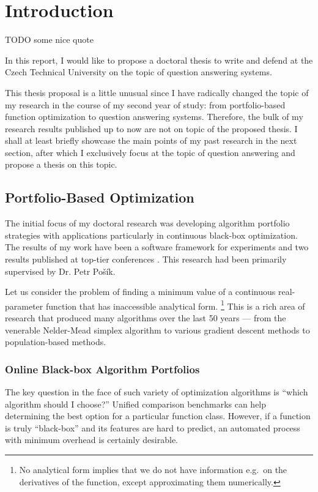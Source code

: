 \chapter{Introduction}
\label{ch:intro}

TODO some nice quote

In this report, I would like to propose a doctoral thesis to write
and defend at the Czech Technical University on the topic of question
answering systems.

This thesis proposal is a little unusual since I have radically changed
the topic of my research in the course of my second year of study:
from portfolio-based function optimization to question answering systems.
Therefore, the bulk of my research results published up to now are not
on topic of the proposed thesis.  I shall at least briefly showcase
the main points of my past research in the next section,
after which I exclusively focus at the topic of question answering
and propose a thesis on this topic.

\section{Portfolio-Based Optimization}

The initial focus of my doctoral research
was developing algorithm portfolio strategies
with applications particularly in continuous black-box optimization.
The results of my work have been a software framework for experiments
\citep{COCOpf}
and two results published at top-tier conferences \citep{optpf,ndsqistep}.
This research had been primarily supervised by Dr. Petr Pošík.

Let us consider the problem of finding a minimum value of a continuous
real-parameter function that has inaccessible analytical form.%
\footnote{No analytical form implies that we do not have information
e.g.\ on the derivatives of the function, except approximating
them numerically.}
This is a rich area of research that produced many algorithms over
the last 50 years --- from the venerable Nelder-Mead simplex
algorithm \citep{NM1} to various gradient descent methods to
population-based methods.

\subsection{Online Black-box Algorithm Portfolios}

The key question in the face of such variety of optimization
algorithms is ``which algorithm should I choose?''
Unified comparison benchmarks \citep{COCO1}
can help determining the best option for a particular function class.
However, if a function is truly ``black-box'' and its features
are hard to predict, an automated process with minimum overhead
is certainly desirable.

